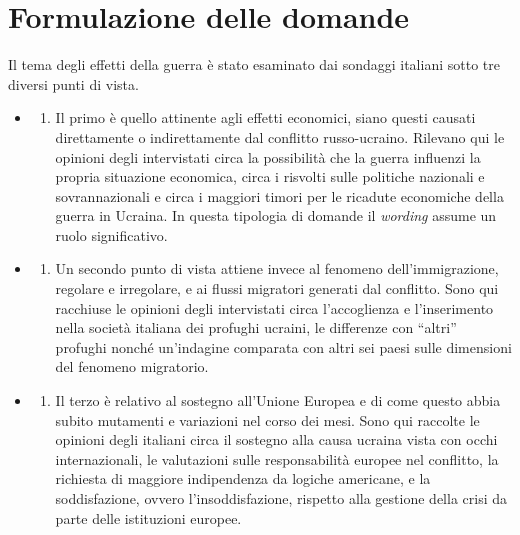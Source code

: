 \documentclass[
  openany]{book}
\providecommand{\tightlist}{%
  \setlength{\itemsep}{0pt}\setlength{\parskip}{0pt}}
\begin{document}
\hypertarget{formulazione-delle-domande-4}{%
\section{Formulazione delle domande}\label{formulazione-delle-domande-4}}

Il tema degli effetti della guerra è stato esaminato dai sondaggi italiani sotto tre diversi punti di vista.

\begin{itemize}
\item
  \begin{enumerate}
  \def\labelenumi{\alph{enumi})}
  \tightlist
  \item
    Il primo è quello attinente agli effetti economici, siano questi causati direttamente o indirettamente dal conflitto russo-ucraino. Rilevano qui le opinioni degli intervistati circa la possibilità che la guerra influenzi la propria situazione economica, circa i risvolti sulle politiche nazionali e sovrannazionali e circa i maggiori timori per le ricadute economiche della guerra in Ucraina. In questa tipologia di domande il \emph{wording} assume un ruolo significativo.
  \end{enumerate}
\item
  \begin{enumerate}
  \def\labelenumi{\alph{enumi})}
  \setcounter{enumi}{1}
  \tightlist
  \item
    Un secondo punto di vista attiene invece al fenomeno dell'immigrazione, regolare e irregolare, e ai flussi migratori generati dal conflitto. Sono qui racchiuse le opinioni degli intervistati circa l'accoglienza e l'inserimento nella società italiana dei profughi ucraini, le differenze con ``altri'' profughi nonché un'indagine comparata con altri sei paesi sulle dimensioni del fenomeno migratorio.
  \end{enumerate}
\item
  \begin{enumerate}
  \def\labelenumi{\alph{enumi})}
  \setcounter{enumi}{2}
  \tightlist
  \item
    Il terzo è relativo al sostegno all'Unione Europea e di come questo abbia subito mutamenti e variazioni nel corso dei mesi. Sono qui raccolte le opinioni degli italiani circa il sostegno alla causa ucraina vista con occhi internazionali, le valutazioni sulle responsabilità europee nel conflitto, la richiesta di maggiore indipendenza da logiche americane, e la soddisfazione, ovvero l'insoddisfazione, rispetto alla gestione della crisi da parte delle istituzioni europee.
  \end{enumerate}
\end{itemize}
\end{document}
